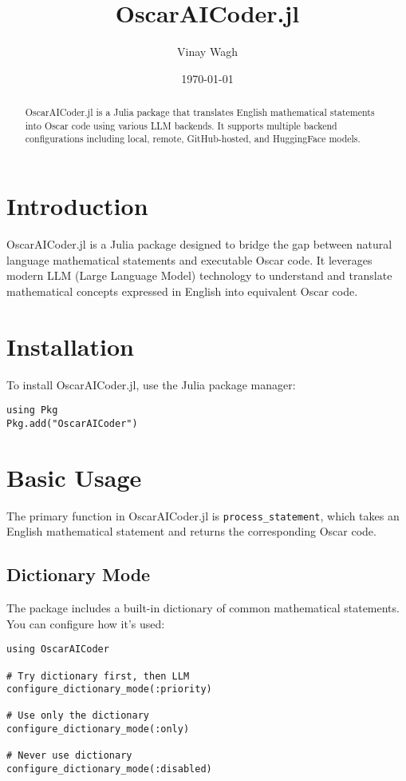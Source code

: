 \documentclass[11pt,a4paper]{article}
\title{\textbf{OscarAICoder.jl}}
\author{Vinay Wagh}
\date{\today}
\begin{document}
\maketitle

\begin{abstract}
OscarAICoder.jl is a Julia package that translates English mathematical statements into Oscar code using various LLM backends. It supports multiple backend configurations including local, remote, GitHub-hosted, and HuggingFace models.
\end{abstract}

\tableofcontents

\section{Introduction}

OscarAICoder.jl is a Julia package designed to bridge the gap between natural language mathematical statements and executable Oscar code. It leverages modern LLM (Large Language Model) technology to understand and translate mathematical concepts expressed in English into equivalent Oscar code.

\section{Installation}

To install OscarAICoder.jl, use the Julia package manager:

\begin{lstlisting}
using Pkg
Pkg.add("OscarAICoder")
\end{lstlisting}

\section{Basic Usage}

The primary function in OscarAICoder.jl is \texttt{process\_statement}, which takes an English mathematical statement and returns the corresponding Oscar code.

\subsection{Dictionary Mode}

The package includes a built-in dictionary of common mathematical statements. You can configure how it's used:

\begin{lstlisting}
using OscarAICoder

# Try dictionary first, then LLM
configure_dictionary_mode(:priority)

# Use only the dictionary
configure_dictionary_mode(:only)

# Never use dictionary
configure_dictionary_mode(:disabled)
\end{lstlisting}
\end{document}

